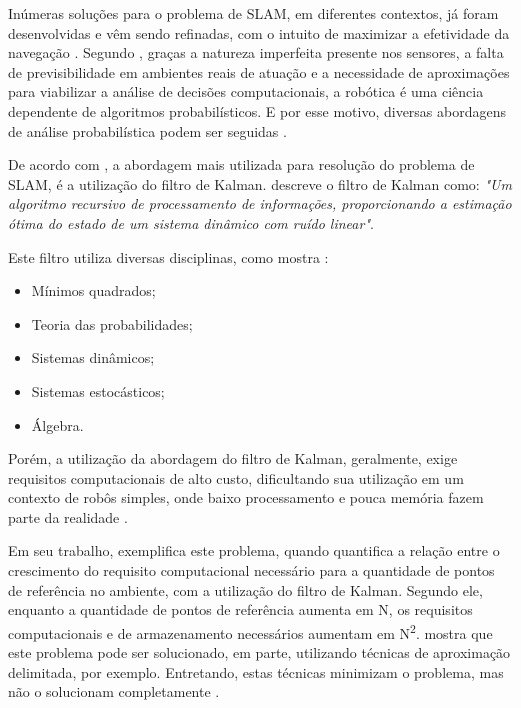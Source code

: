 Inúmeras soluções para o problema de SLAM, em diferentes contextos, já foram desenvolvidas e vêm sendo refinadas, com o intuito de maximizar a efetividade da navegação \cite{theCleaningProject}. Segundo \cite{circumventingAssociationSLAM}, graças a natureza imperfeita presente nos sensores, a falta de previsibilidade em ambientes reais de atuação e a necessidade de aproximações para viabilizar a análise de decisões computacionais, a robótica é uma ciência dependente de algoritmos probabilísticos. E por esse motivo, diversas  abordagens de análise probabilística podem ser seguidas \cite{circumventingAssociationSLAM}.

De acordo com \cite{slamProblem}, a abordagem mais utilizada para resolução do problema de SLAM, é a utilização do filtro de Kalman. \cite{theCleaningProject} descreve o filtro de Kalman como: \textit{"Um algoritmo recursivo de processamento de informações, proporcionando a estimação ótima do estado de um sistema dinâmico com ruído linear"}.

Este filtro utiliza diversas disciplinas, como mostra \cite{theCleaningProject}:
\begin{itemize}
	\item Mínimos quadrados;
	\item Teoria das probabilidades;
	\item Sistemas dinâmicos;
	\item Sistemas estocásticos;
	\item Álgebra.
\end{itemize}

Porém, a utilização da abordagem do filtro de Kalman, geralmente, exige requisitos computacionais de alto custo, dificultando sua utilização em um contexto de robôs simples, onde baixo processamento e pouca memória fazem parte da realidade \cite{agenteExploratorioKalman}.

 Em seu trabalho, \cite{slamProblem} exemplifica este problema, quando quantifica a relação entre o crescimento do requisito computacional necessário para a quantidade de pontos de referência no ambiente, com a utilização do filtro de Kalman. Segundo ele, enquanto a quantidade de pontos de referência aumenta em N, os requisitos computacionais e de armazenamento necessários aumentam em N\textsuperscript{2}. \cite{slamProblem} mostra que este problema pode ser solucionado, em parte, utilizando técnicas de aproximação delimitada, por exemplo. Entretando, estas técnicas minimizam o problema, mas não o solucionam completamente \cite{slamProblem}.

